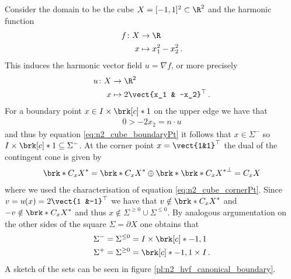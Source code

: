 \begin{example}\label{ex:n2_hvf_canonical}
  Consider the domain to be the cube $X=[-1,1]^2\subset\R^2$
  and the harmonic function
  \begin{equation}
    \begin{aligned}
    f\colon X&\to\R \\
    x&\mapsto x_1^2-x_2^2\,.\label{eq:n2_hf_canonical}
    \end{aligned}
  \end{equation}
  This induces the harmonic vector field $u=\nabla f$, or more precisely
  \begin{equation}
    \begin{aligned}
    u\colon X&\to\R^2 \\
    x&\mapsto 2\vect{x_1 & -x_2}^\top\,.\label{eq:n2_hvf_canonical}
    \end{aligned}
  \end{equation}
  For a boundary point $x\in I\times\brk[c]*{1}$ on the upper edge we have that
  \begin{align*}
    0>  -2x_2=n\cdot u
  \end{align*}
  and thus by equation \eqref{eq:n2_cube_boundaryPt} it follows that $x\in\Sigma^{-}$
  so $I\times\brk[c]*{1}\subseteq\Sigma^{-}$.
  At the corner point $x=\vect{1&1}^\top$ the dual of the contingent cone is given by
  \begin{align}
    \brk*{C_xX}^*=\brk*{C_xX}^*\oplus\brk*{\brk*{C_xX}^*}^\perp =C_xX\label{eq:n2_hvf_canonical_CxX}
  \end{align}
  where we used the characterisation of equation \eqref{eq:n2_cube_cornerPt}.
  Since $v=u(x)=2\vect{1 &-1}^\top$ we have that $v\notin\brk*{C_xX}^*$ and $-v\notin\brk*{C_xX}^*$
  and thus $x\notin\Sigma^{\geq0}\cup\Sigma^{\leq0}$.
  By analogous argumentation on the other sides of the square $\Sigma=\partial X$
  one obtains that
  \begin{align*}
    \Sigma^-=\Sigma^{\leq0}&=I\times\brk[c]*{-1,1}\\
    \Sigma^+=\Sigma^{\geq0}&=\brk[c]*{-1,1}\times I\,.
  \end{align*}
  A sketch of the sets can be seen in figure \ref{pl:n2_hvf_canonical_boundary}.
\end{example}

